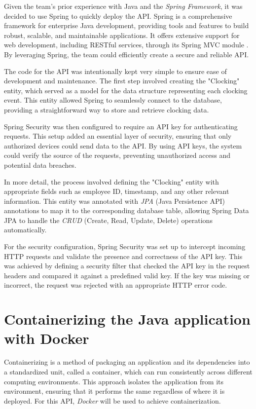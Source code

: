 Given the team's prior experience with Java and the \textit{Spring Framework}, it was decided to 
use Spring to quickly deploy the API. Spring is a comprehensive framework for enterprise Java 
development, providing tools and features to build robust, scalable, and maintainable 
applications. It offers extensive support for web development, including RESTful services, through 
its Spring MVC module \cite{spring_docs}. By leveraging Spring, the team could efficiently create 
a secure and reliable API.

The code for the API was intentionally kept very simple to ensure ease of development and 
maintenance. The first step involved creating the "Clocking" entity, which served as a model for 
the data structure representing each clocking event. This entity allowed Spring to seamlessly 
connect to the database, providing a straightforward way to store and retrieve clocking data.

Spring Security was then configured to require an API key for authenticating requests. This setup 
added an essential layer of security, ensuring that only authorized devices could send data to 
the API. By using API keys, the system could verify the source of the requests, preventing 
unauthorized access and potential data breaches.

In more detail, the process involved defining the "Clocking" entity with appropriate fields such 
as employee ID, timestamp, and any other relevant information. This entity was annotated with 
\textit{JPA} (Java Persistence API) annotations to map it to the corresponding database table, 
allowing Spring Data JPA to handle the \textit{CRUD} (Create, Read, Update, Delete) operations 
automatically.

For the security configuration, Spring Security was set up to intercept incoming HTTP requests and 
validate the presence and correctness of the API key. This was achieved by defining a security 
filter that checked the API key in the request headers and compared it against a predefined valid 
key. If the key was missing or incorrect, the request was rejected with an appropriate HTTP error 
code.


\section{Containerizing the Java application with Docker}

Containerizing is a method of packaging an application and its dependencies into a standardized 
unit, called a container, which can run consistently across different computing environments. 
This approach isolates the application from its environment, ensuring that it performs the same 
regardless of where it is deployed. For this API, \textit{Docker} will be used to achieve 
containerization.

